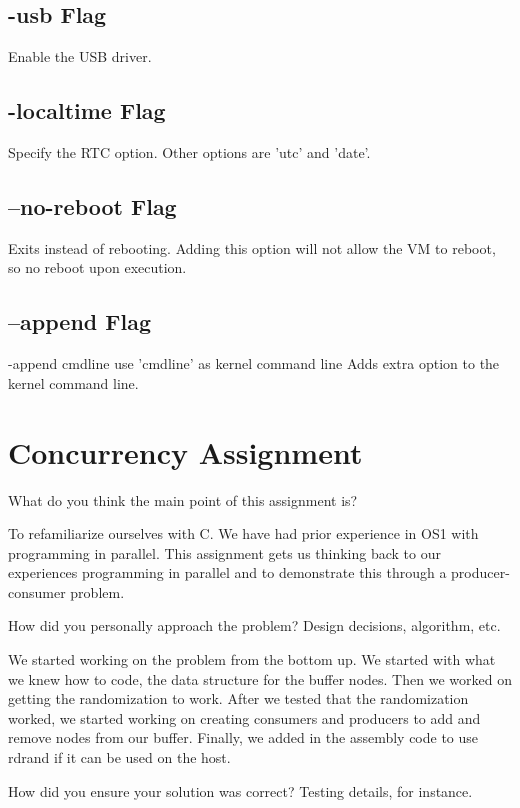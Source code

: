 \documentclass[10pt,a4paper,english]{article}
\newenvironment{question}[2][Question]	{\begin{trivlist}
\item[\hskip \labelsep {\bfseries #1}\hskip \labelsep {\bfseries #2.}]}
{\end{trivlist}} %
\begin{document}
\subsection{-usb Flag}
Enable the USB driver.

\subsection{-localtime Flag}
Specify the RTC option. Other options are 'utc' and 'date'.

\subsection{--no-reboot Flag}
Exits instead of rebooting. Adding this option will not allow the VM to reboot, so no reboot upon execution.

\subsection{--append Flag}
-append cmdline use 'cmdline' as kernel command line
Adds extra option to the kernel command line.


\section{Concurrency Assignment}
\begin{question}{1}
What do you think the main point of this assignment is?
\end{question}

To refamiliarize ourselves with C. We have had prior experience in OS1 with programming in parallel. This assignment gets us thinking back to our experiences programming in parallel and to demonstrate this through a producer-consumer problem.

\begin{question}{2}
How did you personally approach the problem? Design decisions, algorithm, etc.
\end{question}

We started working on the problem from the bottom up. We started with what we knew how to code, the data structure for the buffer nodes. Then we worked on getting the randomization to work. After we tested that the randomization worked, we started working on creating consumers and producers to add and remove nodes from our buffer. Finally, we added in the assembly code to use rdrand if it can be used on the host. 

\begin{question}{3}
How did you ensure your solution was correct? Testing details, for instance.
\end{question}
\end{document}
